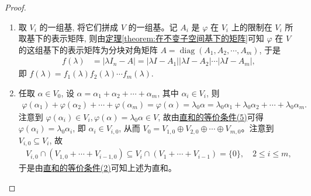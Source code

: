 \documentclass[lang=cn,newtx,10pt,scheme=chinese]{elegantbook}
\begin{document}
\begin{proof}
\begin{enumerate}[(1)]
\item  取 $V_i$ 的一组基, 将它们拼成 $V$ 的一组基。记 $A_i$ 是 $\varphi$ 在 $V_i$ 上的限制在 $V_i$ 所取基下的表示矩阵, 则由\hyperref[theorem:在不变子空间基下的矩阵]{定理\ref{theorem:在不变子空间基下的矩阵}}可知 $\varphi$ 在 $V$ 的这组基下的表示矩阵为分块对角矩阵 $A = \operatorname{diag}(A_1, A_2, \cdots, A_m)$, 于是
\begin{align*}
f(\lambda) &= |\lambda I_n - A| = |\lambda I - A_1| |\lambda I - A_2| \cdots |\lambda I - A_m|,
\end{align*}
即 $f(\lambda) = f_1(\lambda) f_2(\lambda) \cdots f_m(\lambda)$.

\item 任取 $\alpha \in V_0$, 设 $\alpha = \alpha_1 + \alpha_2 + \cdots + \alpha_m$, 其中 $\alpha_i \in V_i$, 则
\begin{align*}
\varphi(\alpha_1) + \varphi(\alpha_2) + \cdots + \varphi(\alpha_m) = \varphi(\alpha) = \lambda_0 \alpha = \lambda_0 \alpha_1 + \lambda_0 \alpha_2 + \cdots + \lambda_0 \alpha_m.
\end{align*}
注意到 $\varphi(\alpha_i) \in V_i,\varphi(\alpha) = \lambda_0 \alpha\in V$, 故由\hyperref[theorem:直和的等价条件]{直和的等价条件(5)}可得 $\varphi(\alpha_i) = \lambda_0 \alpha_i$, 即 $\alpha_i \in V_{i,0}$, 从而 $V_0 = V_{1,0} \oplus V_{2,0} \oplus \cdots \oplus V_{m,0}$。注意到 $V_{i,0} \subseteq V_i$, 故
\begin{align*}
V_{i,0} \cap (V_{1,0} + \cdots + V_{i-1,0}) \subseteq V_i \cap (V_1 + \cdots + V_{i-1}) = \{0\}, \quad 2 \leq i \leq m,
\end{align*}
于是由\hyperref[theorem:直和的等价条件]{直和的等价条件(2)}可知上述为直和。
\end{enumerate}
\end{proof}
\end{document}
